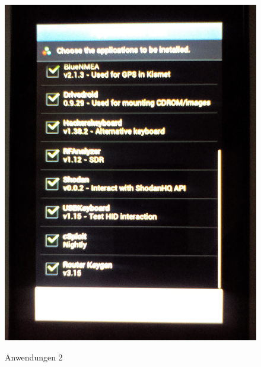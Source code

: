 \documentclass[11pt,a4paper]{article}
\begin{document}
\begin{figure}[H]
\begin{center} \includegraphics[scale=0.1]{./Image/img15}  \\
\caption{Anwendungen 2}
\end{center}
\end{figure} 
\end{document}
